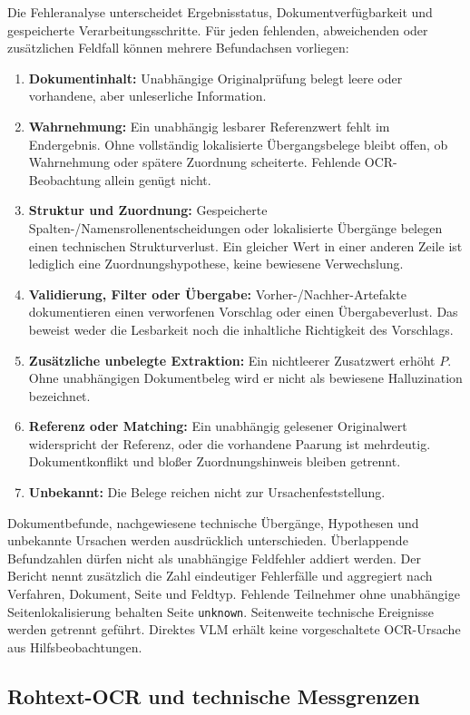 Die Fehleranalyse unterscheidet Ergebnisstatus, Dokumentverfügbarkeit und gespeicherte Verarbeitungsschritte. Für jeden fehlenden, abweichenden oder zusätzlichen Feldfall können mehrere Befundachsen vorliegen:
\begin{enumerate}
  \item \textbf{Dokumentinhalt:} Unabhängige Originalprüfung belegt leere oder vorhandene, aber unleserliche Information.
  \item \textbf{Wahrnehmung:} Ein unabhängig lesbarer Referenzwert fehlt im Endergebnis. Ohne vollständig lokalisierte Übergangsbelege bleibt offen, ob Wahrnehmung oder spätere Zuordnung scheiterte. Fehlende OCR-Beobachtung allein genügt nicht.
  \item \textbf{Struktur und Zuordnung:} Gespeicherte Spalten-/Namensrollenentscheidungen oder lokalisierte Übergänge belegen einen technischen Strukturverlust. Ein gleicher Wert in einer anderen Zeile ist lediglich eine Zuordnungshypothese, keine bewiesene Verwechslung.
  \item \textbf{Validierung, Filter oder Übergabe:} Vorher-/Nachher-Artefakte dokumentieren einen verworfenen Vorschlag oder einen Übergabeverlust. Das beweist weder die Lesbarkeit noch die inhaltliche Richtigkeit des Vorschlags.
  \item \textbf{Zusätzliche unbelegte Extraktion:} Ein nichtleerer Zusatzwert erhöht $P$. Ohne unabhängigen Dokumentbeleg wird er nicht als bewiesene Halluzination bezeichnet.
  \item \textbf{Referenz oder Matching:} Ein unabhängig gelesener Originalwert widerspricht der Referenz, oder die vorhandene Paarung ist mehrdeutig. Dokumentkonflikt und bloßer Zuordnungshinweis bleiben getrennt.
  \item \textbf{Unbekannt:} Die Belege reichen nicht zur Ursachenfeststellung.
\end{enumerate}
Dokumentbefunde, nachgewiesene technische Übergänge, Hypothesen und unbekannte Ursachen werden ausdrücklich unterschieden. Überlappende Befundzahlen dürfen nicht als unabhängige Feldfehler addiert werden. Der Bericht nennt zusätzlich die Zahl eindeutiger Fehlerfälle und aggregiert nach Verfahren, Dokument, Seite und Feldtyp. Fehlende Teilnehmer ohne unabhängige Seitenlokalisierung behalten Seite \texttt{unknown}. Seitenweite technische Ereignisse werden getrennt geführt. Direktes VLM erhält keine vorgeschaltete OCR-Ursache aus Hilfsbeobachtungen.

\subsection{Rohtext-OCR und technische Messgrenzen}


